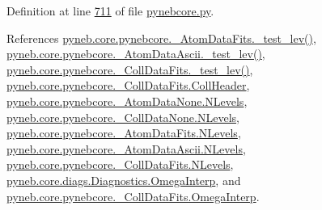 Definition at line \hyperlink{pynebcore_8py_source_l00711}{711} of file \hyperlink{pynebcore_8py_source}{pynebcore.\-py}.



References \hyperlink{pynebcore_8py_source_l00178}{pyneb.\-core.\-pynebcore.\-\_\-\-Atom\-Data\-Fits.\-\_\-test\-\_\-lev()}, \hyperlink{pynebcore_8py_source_l00447}{pyneb.\-core.\-pynebcore.\-\_\-\-Atom\-Data\-Ascii.\-\_\-test\-\_\-lev()}, \hyperlink{pynebcore_8py_source_l00677}{pyneb.\-core.\-pynebcore.\-\_\-\-Coll\-Data\-Fits.\-\_\-test\-\_\-lev()}, \hyperlink{pynebcore_8py_source_l00638}{pyneb.\-core.\-pynebcore.\-\_\-\-Coll\-Data\-Fits.\-Coll\-Header}, \hyperlink{pynebcore_8py_source_l00069}{pyneb.\-core.\-pynebcore.\-\_\-\-Atom\-Data\-None.\-N\-Levels}, \hyperlink{pynebcore_8py_source_l00082}{pyneb.\-core.\-pynebcore.\-\_\-\-Coll\-Data\-None.\-N\-Levels}, \hyperlink{pynebcore_8py_source_l00098}{pyneb.\-core.\-pynebcore.\-\_\-\-Atom\-Data\-Fits.\-N\-Levels}, \hyperlink{pynebcore_8py_source_l00319}{pyneb.\-core.\-pynebcore.\-\_\-\-Atom\-Data\-Ascii.\-N\-Levels}, \hyperlink{pynebcore_8py_source_l00586}{pyneb.\-core.\-pynebcore.\-\_\-\-Coll\-Data\-Fits.\-N\-Levels}, \hyperlink{diags_8py_source_l00000}{pyneb.\-core.\-diags.\-Diagnostics.\-Omega\-Interp}, and \hyperlink{pynebcore_8py_source_l00672}{pyneb.\-core.\-pynebcore.\-\_\-\-Coll\-Data\-Fits.\-Omega\-Interp}.


